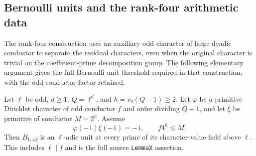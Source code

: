 \subsection{Bernoulli units and the rank-four arithmetic data}
\label{sec:selmer-dyadic-twist-vanishing}

The rank-four construction uses an auxiliary odd character of large
dyadic conductor to separate the residual characters, even when the
original character is trivial on the coefficient-prime decomposition
group. The following elementary argument gives the full Bernoulli
unit threshold required in that construction, with the odd conductor
factor retained.

\begin{theorem}
\label{thm:selmer-dyadic-twist-unit}
Let $\ell$ be odd, $d\ge1$, $Q=\ell^d$, and
$h=v_2(Q-1)\ge2$. Let $\varphi$ be a primitive Dirichlet
character of odd conductor $f$ and order dividing $Q-1$,
and let $\xi$ be primitive of conductor $M=2^n$.
Assume
\[
       \varphi(-1)\xi(-1)=-1,\qquad f4^h\le M.        \tag{BU1}
\]
Then $B_{1,\varphi\xi}$ is an $\ell$-adic unit at every
prime of its character-value field above $\ell$.
This includes $\ell\mid f$ and is the full source
\texttt{LemmaX} assertion.
\end{theorem}

